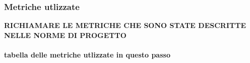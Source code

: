 \subsubsection{Metriche utlizzate}
\textbf{RICHIAMARE LE METRICHE CHE SONO STATE DESCRITTE NELLE NORME DI PROGETTO}
\paragraph{tabella delle metriche utlizzate in questo passo}